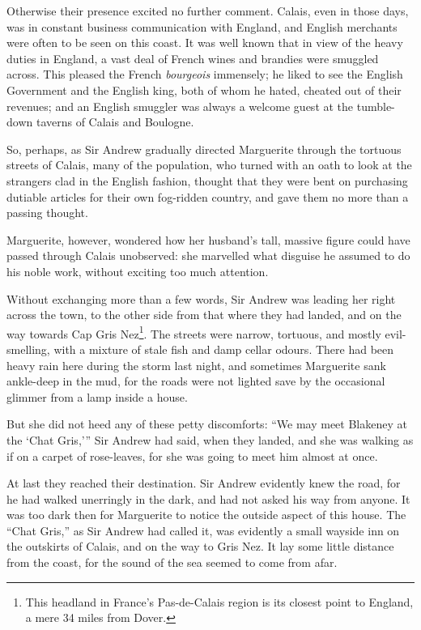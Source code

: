 \documentclass[paper=5.5in:8.5in,BCOR=7mm,twoside,DIV=calc,12pt,usegeometry,chapterprefix,endperiod,headings=big]{scrbook}
\begin{document}
Otherwise their presence excited no further comment. Calais, even in those days, was in constant business communication with England, and English merchants were often to be seen on this coast. It was well known that in view of the heavy duties in England, a vast deal of French wines and brandies were smuggled across. This pleased the French \textit{bourgeois} immensely; he liked to see the English Government and the English king, both of whom he hated, cheated out of their revenues; and an English smuggler was always a welcome guest at the tumble-down taverns of Calais and Boulogne.

So, perhaps, as Sir Andrew gradually directed Marguerite through the tortuous streets of Calais, many of the population, who turned with an oath to look at the strangers clad in the English fashion, thought that they were bent on purchasing dutiable articles for their own fog-ridden country, and gave them no more than a passing thought.

Marguerite, however, wondered how her husband's tall, massive figure could have passed through Calais unobserved: she marvelled what disguise he assumed to do his noble work, without exciting too much attention.

Without exchanging more than a few words, Sir Andrew was leading her right across the town, to the other side from that where they had landed, and on the way towards Cap Gris Nez\footnote{This headland in France's Pas-de-Calais region is its closest point to England, a mere 34 miles from Dover.}. The streets were narrow, tortuous, and mostly evil-smelling, with a mixture of stale fish and damp cellar odours. There had been heavy rain here during the storm last night, and sometimes Marguerite sank ankle-deep in the mud, for the roads were not lighted save by the occasional glimmer from a lamp inside a house.

But she did not heed any of these petty discomforts: \enquote{We may meet Blakeney at the \enquote{Chat Gris,}} Sir Andrew had said, when they landed, and she was walking as if on a carpet of rose-leaves, for she was going to meet him almost at once.

At last they reached their destination. Sir Andrew evidently knew the road, for he had walked unerringly in the dark, and had not asked his way from anyone. It was too dark then for Marguerite to notice the outside aspect of this house. The \enquote{Chat Gris,} as Sir Andrew had called it, was evidently a small wayside inn on the outskirts of Calais, and on the way to Gris Nez. It lay some little distance from the coast, for the sound of the sea seemed to come from afar.
\end{document}
